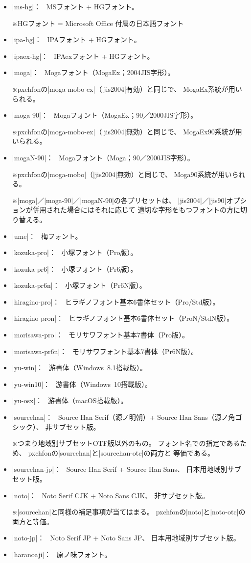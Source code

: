 \documentclass[xelatex,ja=standard,jafont=ipaex,
  a4paper]{bxjsarticle}
\newcommand{\Pkg}[1]{\textsf{#1}}
\newcommand{\Note}{\par\noindent ※}
\newcommand{\Means}{：\ }
\newcommand{\JSl}{\mbox{／}\linebreak[0]}
\begin{document}
\begin{itemize}
\item |ms-hg|\Means
  MSフォント + HGフォント。
  \Note HGフォント = Microsoft Office 付属の日本語フォント
\item |ipa-hg|\Means
  IPAフォント + HGフォント。
\item |ipaex-hg|\Means
  IPAexフォント + HGフォント。
\item |moga|\Means
  Mogaフォント（MogaEx；2004JIS字形）。
  \Note \Pkg{pxchfon}の\>|moga-mobo-ex|（|jis2004|\>有効）と同じで、
  MogaEx系統が用いられる。
\item |moga-90|\Means
  Mogaフォント（MogaEx；90\JSl 2000JIS字形）。
  \Note \Pkg{pxchfon}の\>|moga-mobo-ex|（|jis2004|\>無効）と同じで、
  MogaEx90系統が用いられる。
\item |mogaN-90|\Means
  Mogaフォント（Moga；90\JSl 2000JIS字形）。
  \Note \Pkg{pxchfon}の\>|moga-mobo|（|jis2004|\>無効）と同じで、
  Moga90系統が用いられる。
  \Note |moga|\JSl|moga-90|\JSl|mogaN-90|\>の各プリセットは、%
  |jis2004|\JSl|jis90|\>オプションが併用された場合にはそれに応じて
  適切な字形をもつフォントの方に切り替える。
\item |ume|\Means
  梅フォント。
\item |kozuka-pro|\Means
  小塚フォント（Pro版）。
\item |kozuka-pr6|\Means
  小塚フォント（Pr6版）。
\item |kozuka-pr6n|\Means
  小塚フォント（Pr6N版）。
\item |hiragino-pro|\Means
  ヒラギノフォント基本6書体セット（Pro/Std版）。
\item |hiragino-pron|\Means
  ヒラギノフォント基本6書体セット（ProN/StdN版）。
\item |morisawa-pro|\Means
  モリサワフォント基本7書体（Pro版）。
\item |morisawa-pr6n|\Means
  モリサワフォント基本7書体（Pr6N版）。
\item |yu-win|\Means
  游書体（Windows~8.1搭載版）。
\item |yu-win10|\Means
  游書体（Windows~10搭載版）。%
\item |yu-osx|\Means
  游書体（macOS搭載版）。
\item |sourcehan|\Means
  Source Han Serif（源ノ明朝）+ Source Han Sans（源ノ角ゴシック）、
  非サブセット版。%
  \Note つまり地域別サブセットOTF版以外のもの。
  フォント名での指定であるため、%
  \Pkg{pxchfon}の\>|sourcehan|\>と\>|sourcehan-otc|\>の両方と
  等価である。
\item |sourcehan-jp|\Means
  Source Han Serif + Source Han Sans、
  日本用地域別サブセット版。
\item |noto|\Means
  Noto Serif CJK + Noto Sans CJK、
  非サブセット版。
  \Note |sourcehan|\>と同様の補足事項が当てはまる。
  \Pkg{pxchfon}の\>|noto|\>と\>|noto-otc|\>の両方と等価。
\item |noto-jp|\Means
  Noto Serif JP + Noto Sans JP、
  日本用地域別サブセット版。
\item |haranoaji|\Means
  原ノ味フォント。
\end{itemize}
\end{document}
